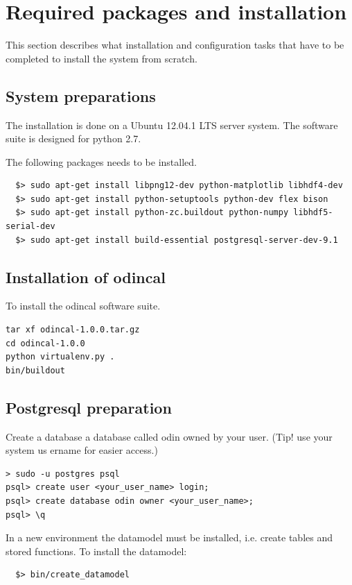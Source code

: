 \documentclass[12pt]{article}
\begin{document}
      
 


\section{Required packages and installation}
This section describes what installation and configuration tasks that have to be completed to install the system from scratch.
\subsection{System preparations}
The installation is done on a Ubuntu 12.04.1 LTS server system. The software suite is designed for python 2.7.

The following packages needs to be installed.
\begin{verbatim}  
  $> sudo apt-get install libpng12-dev python-matplotlib libhdf4-dev
  $> sudo apt-get install python-setuptools python-dev flex bison
  $> sudo apt-get install python-zc.buildout python-numpy libhdf5-serial-dev
  $> sudo apt-get install build-essential postgresql-server-dev-9.1
\end{verbatim}


\subsection{Installation of odincal}

To install the odincal software suite. 

\begin{verbatim}
tar xf odincal-1.0.0.tar.gz
cd odincal-1.0.0
python virtualenv.py .
bin/buildout
\end{verbatim}


\subsection{Postgresql preparation}
Create a database a database called odin owned by your user. (Tip! use your system us
ername for easier access.)
 
\begin{verbatim}  
> sudo -u postgres psql
psql> create user <your_user_name> login;
psql> create database odin owner <your_user_name>;
psql> \q
\end{verbatim}

In a new environment the datamodel must be installed, i.e. create tables and stored functions. To install the datamodel:

\begin{verbatim}  
  $> bin/create_datamodel
\end{verbatim}
\end{document}
